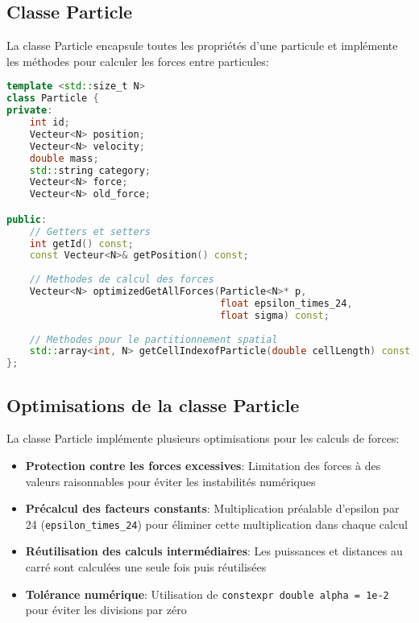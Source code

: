 \documentclass[12pt,a4paper]{article}
\begin{document}
\subsection{Classe Particle}

La classe Particle encapsule toutes les propriétés d'une particule et implémente les méthodes pour calculer les forces entre particules:

\begin{lstlisting}[language=C++, caption=Extrait de la classe Particle]
template <std::size_t N>
class Particle {
private:
    int id;
    Vecteur<N> position;
    Vecteur<N> velocity;
    double mass;
    std::string category;
    Vecteur<N> force;
    Vecteur<N> old_force;

public:
    // Getters et setters
    int getId() const;
    const Vecteur<N>& getPosition() const;
    
    // Methodes de calcul des forces
    Vecteur<N> optimizedGetAllForces(Particle<N>* p, 
                                     float epsilon_times_24,
                                     float sigma) const;
    
    // Methodes pour le partitionnement spatial
    std::array<int, N> getCellIndexofParticle(double cellLength) const;
};
\end{lstlisting}

\subsection{Optimisations de la classe Particle}

La classe Particle implémente plusieurs optimisations pour les calculs de forces:

\begin{itemize}
    \item \textbf{Protection contre les forces excessives}: Limitation des forces à des valeurs raisonnables pour éviter les instabilités numériques
    \item \textbf{Précalcul des facteurs constants}: Multiplication préalable d'epsilon par 24 (\texttt{epsilon\_times\_24}) pour éliminer cette multiplication dans chaque calcul
    \item \textbf{Réutilisation des calculs intermédiaires}: Les puissances et distances au carré sont calculées une seule fois puis réutilisées
    \item \textbf{Tolérance numérique}: Utilisation de \texttt{constexpr double alpha = 1e-2} pour éviter les divisions par zéro
\end{itemize}
\end{document}
